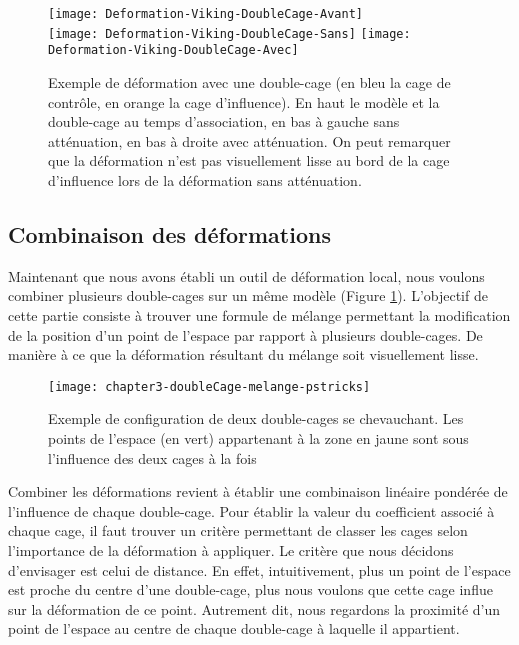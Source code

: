 \begin{figure}[ht]
  \begin{center}
    \texttt{[image: Deformation-Viking-DoubleCage-Avant]}\\
    \texttt{[image: Deformation-Viking-DoubleCage-Sans]}
    \texttt{[image: Deformation-Viking-DoubleCage-Avec]}

    \caption[Exemple de déformation double-cage] {Exemple de déformation avec
une double-cage (en bleu la cage de contrôle, en orange la cage d'influence).
En haut le modèle et la double-cage au temps d'association, en bas à gauche
sans atténuation, en bas à droite avec atténuation. On peut
remarquer que la déformation n'est pas visuellement lisse au bord de la cage
d'influence lors de la déformation sans atténuation.}

  \end{center}
\end{figure}

\subsection{Combinaison des déformations}

Maintenant que nous avons établi un outil de déformation local, nous voulons
combiner plusieurs double-cages sur un même modèle (Figure \ref{MELMC}).
L'objectif de cette partie consiste à trouver une formule de mélange
permettant la modification de la position d'un point de l'espace par rapport à
plusieurs double-cages. De manière à ce que la déformation résultant du
mélange soit visuellement lisse.

\begin{figure}[ht]
  \begin{center}
    \texttt{[image: chapter3-doubleCage-melange-pstricks]}

    \caption[Mélange de double-cages] {Exemple de
configuration de deux double-cages se chevauchant. Les points
de l'espace (en vert) appartenant à la zone en jaune sont sous l'influence des
deux cages à la fois}

    \label{MELMC}
  \end{center}
\end{figure}

Combiner les déformations revient à établir une combinaison linéaire pondérée
de l'influence de chaque double-cage. Pour établir la valeur du coefficient
associé à chaque cage, il faut trouver un critère permettant de classer les
cages selon l'importance de la déformation à appliquer. Le critère que nous
décidons d'envisager est celui de distance. En effet, intuitivement, plus un
point de l'espace est proche du centre d'une double-cage, plus nous voulons
que cette cage influe sur la déformation de ce point. Autrement dit, nous
regardons la proximité d'un point de l'espace au centre de chaque double-cage
à laquelle il appartient.

